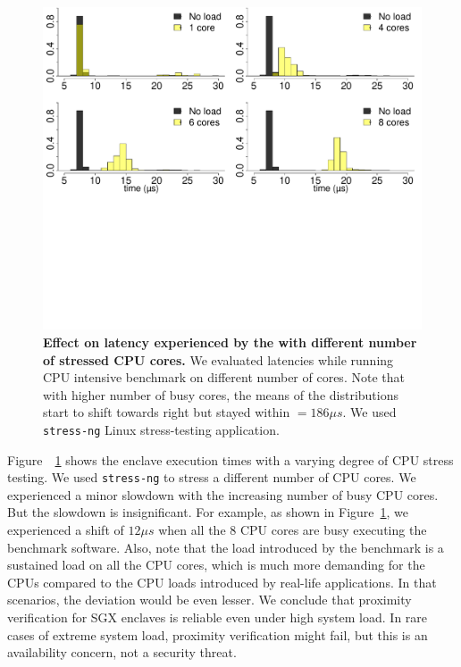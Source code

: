\begin{figure}[t]
  \centering
    \includegraphics[trim={0 12cm 0 0}, clip, width=\linewidth]{chapters/ProximiTEE/data/CPU_stress/allCore_SGX_1.pdf}
    \caption[Effect on latency experienced by the \device with different number of stressed CPU cores]{\textbf{Effect on latency experienced by the \device with different number of stressed CPU cores.} We evaluated latencies while running CPU intensive benchmark on different number of cores. Note that with higher number of busy cores, the means of the  distributions start to shift towards right but stayed within \connect $= 186\mu s$. We used \texttt{stress-ng} Linux stress-testing application.}
    \label{graph:cpuLoad_SGX}
\end{figure}


 Figure~~\ref{graph:cpuLoad_SGX} shows the enclave execution times with a varying degree of CPU stress testing. We used \texttt{stress-ng} to stress a different number of CPU cores. We experienced a minor slowdown with the increasing number of busy CPU cores. But the slowdown is insignificant. For example, as shown in Figure~\ref{graph:cpuLoad_SGX}, we experienced a shift of $12\mu s$ when all the 8 CPU cores are busy executing the benchmark software. Also, note that the load introduced by the benchmark is a sustained load on all the CPU cores, which is much more demanding for the CPUs compared to the CPU loads introduced by real-life applications. In that scenarios, the deviation would be even lesser. We conclude that proximity verification for SGX enclaves is reliable even under high system load. In rare cases of extreme system load, proximity verification might fail, but this is an availability concern, not a security threat.


